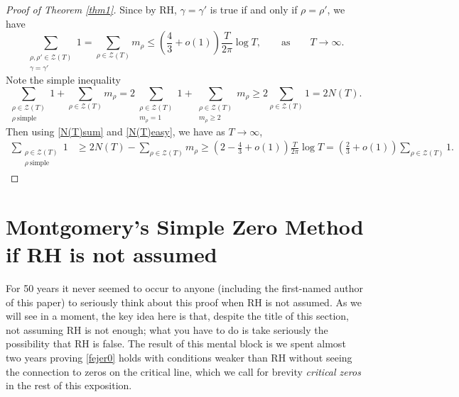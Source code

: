\documentclass[11pt]{amsart}
\theoremstyle{remark}
\theoremstyle{plain}
\numberwithin{equation}{section}
\begin{document}
\begin{proof}[Proof of Theorem \ref{thm1}]
Since by RH, $\gamma=\gamma'$ is true if and only if $\rho = \rho'$, we have
\begin{equation}\label{multiplicityweight}
\sum_{\substack{\rho,\rho' \in \mathcal{Z}(T)\\ \gamma=\gamma'}}1
= \sum_{\rho \in \mathcal{Z}(T)} m_\rho
\le \left(\frac43+o(1)\right) \frac{T}{2\pi}\log{T},\qquad \text{as}
\qquad T\to\infty. \end{equation}
Note the simple inequality
\begin{equation}\label{Mont_simple}
    \sum_{\substack{\rho \in \mathcal{Z}(T) \\ \rho \ \text{simple}}}1
    +
    \sum_{\rho \in \mathcal{Z}(T)} m_\rho
    =
    2 \sum_{\substack{\rho \in \mathcal{Z}(T) \\ m_\rho=1}} 1
    +
    \sum_{\substack{\rho \in \mathcal{Z}(T) \\ m_\rho\ge2}} m_\rho
    \ge 2 \sum_{\rho \in \mathcal{Z}(T)} 1 = 2N(T).
\end{equation}
Then using \eqref{N(T)sum} and \eqref{N(T)easy}, we have as $T\to\infty$,
\[\begin{split}
\sum_{\substack{\rho \in \mathcal{Z}(T) \\ \rho \ \text{simple}}}1
&\ge
2N(T)-\sum_{\rho \in \mathcal{Z}(T)} m_\rho
\ge \left(2-\frac43+o(1)\right)\frac{T}{2\pi}\log{T}
= \left(\frac23+o(1)\right)\sum_{\rho \in \mathcal{Z}(T)}1.
\end{split}\]
\end{proof}


\section{Montgomery's Simple Zero Method if RH is not assumed}

For 50 years it never seemed to occur to anyone (including the first-named author of this paper) to seriously think about this proof when RH is not assumed. As we will see in a moment, the key idea here is that, despite the title of this section, not assuming RH is not enough; what you have to do is take seriously the possibility that RH is false. The result of this mental block is we spent almost two years proving \eqref{fejer0} holds with conditions weaker than RH without seeing the connection to zeros on the critical line, which we call for brevity {\it critical zeros} in the rest of this exposition. 
\end{document}
